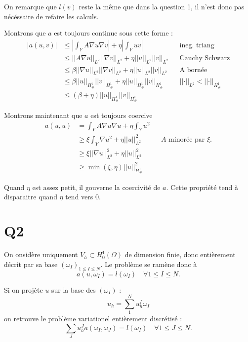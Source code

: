 \documentclass[11pt]{article}
\newcommand{\norm}[1]{\left|\left|#1\right|\right|}
\newcommand{\Hd}{H^1_{\#}}
\begin{document}
On remarque que $l(v)$ reste la même que dans la question 1, il n'est donc pas nécéssaire de refaire les calculs.

Montrons que $a$ est toujours continue sous cette forme :
\begin{align}
  \label{eq:ac}
  \big|a(u,v)\big| &\leq \left| \int_Y A \nabla u \nabla v \right| + \eta \left| \int_Y  u v \right| && \mbox{ineg. triang} \\
                   &\leq \norm{A\nabla u}_{L^2} \norm{\nabla v}_{L^2} + \eta \norm{u}_{L^2} \norm{v}_{L^2} && \mbox{Cauchy Schwarz} \\
                   &\leq \beta \norm{\nabla u}_{L^2} \norm{\nabla v}_{L^2} + \eta \norm{u}_{L^2} \norm{v}_{L^2} && \mbox{A bornée} \\
                   &\leq \beta \norm{u}_{\Hd} \norm{v}_{\Hd} + \eta \norm{u}_{\Hd} \norm{v}_{\Hd} && \norm{\cdot}_{L^2}<\norm{\cdot}_{\Hd} \\
                   &\leq (\beta + \eta) \norm{u}_{\Hd} \norm{v}_{\Hd}
\end{align}

Montrons maintenant que $a$ est toujours coercive
\begin{align}
  \label{eq:co}
  a(u,u) &= \int_Y A \nabla u  \nabla u + \eta \int_Y u^2 \\
         &\geq \xi \int_Y \nabla u^2 + \eta \norm{u}^2_{L^2} && \text{$A$ minorée par $\xi$.}\\
         &\geq \xi \norm{\nabla u}^2_{L^2} + \eta \norm{u}^2_{L^2} \\
         &\geq \min(\xi, \eta) \norm{u}^2_{\Hd}  
\end{align} 

Quand $\eta$ est assez petit, il gouverne la coercivité de $a$. Cette propriété tend à disparaitre quand $\eta$ tend vers $0$.

\section{Q2}

On onsidère uniquement $V_h \subset H^1_0(\Omega)$ de dimension finie, donc entièrement décrit par sa base $(\omega_I)_{1\leq I \leq N}$. Le problème se ramène donc à
\begin{equation}
  a(u,\omega_I) = l(\omega_I) \quad \forall 1\leq I\leq N.
\end{equation}

Si on projète $u$ sur la base des $(\omega_I)$ :
\begin{equation}
  u_h = \sum_{1}^{N} u_h^I \omega_I
\end{equation}
on retrouve le problème variationel entièrement discrétisé :
\begin{equation}
  \sum_J u_h^J a(\omega_I, \omega_J) = l(\omega_I) \quad \forall  1\leq J\leq N.   
\end{equation}
\end{document}

